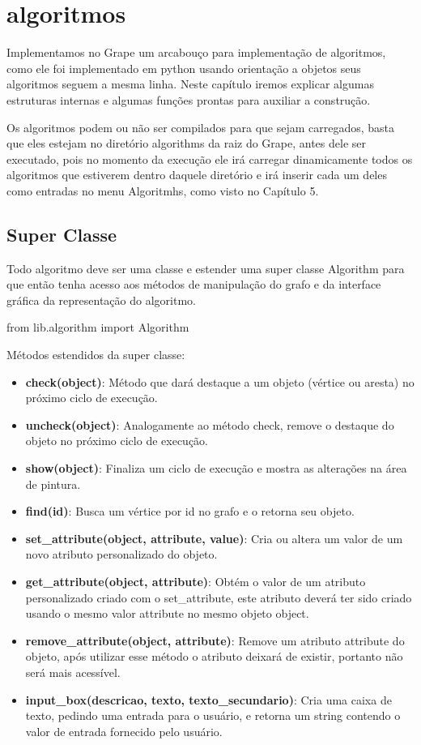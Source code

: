 \documentclass[a4paper]{abnt}
\begin{document}
\chapter{algoritmos}

Implementamos no Grape um arcabouço para implementação de algoritmos, como ele foi implementado em python usando orientação a objetos seus algoritmos seguem a mesma linha. Neste capítulo iremos explicar algumas estruturas internas e algumas funções prontas para auxiliar a construção.

Os algoritmos podem ou não ser compilados para que sejam carregados, basta que eles estejam no diretório algorithms da raiz do Grape, antes dele ser executado, pois no momento da execução ele irá carregar dinamicamente todos os algoritmos que estiverem dentro daquele diretório e irá inserir cada um deles como entradas no menu Algoritmhs, como visto no Capítulo 5.

\section{Super Classe}

Todo algoritmo deve ser uma classe e estender uma super classe Algorithm para que então tenha acesso aos métodos de manipulação do grafo e da interface gráfica da representação do algoritmo.

\begin{python}
    from lib.algorithm import Algorithm
\end{python}

Métodos estendidos da super classe:

\begin{itemize}
    \item \textbf{check(object)}: Método que dará destaque a um objeto (vértice ou aresta) no próximo ciclo de execução.
    \item \textbf{uncheck(object)}: Analogamente ao método check, remove o destaque do objeto no próximo ciclo de execução.
    \item \textbf{show(object)}: Finaliza um ciclo de execução e mostra as alterações na área de pintura.
    \item \textbf{find(id)}: Busca um vértice por id no grafo e o retorna seu objeto.
    \item \textbf{set\_attribute(object, attribute, value)}: Cria ou altera um valor de um novo atributo  personalizado do objeto.
    \item \textbf{get\_attribute(object, attribute)}: Obtém o valor de um atributo personalizado criado com o set\_attribute, este atributo deverá ter sido criado usando o mesmo valor attribute no mesmo objeto object.
    \item \textbf{remove\_attribute(object, attribute)}: Remove um atributo attribute do objeto, após utilizar esse método o atributo deixará de existir, portanto não será mais acessível.
    \item \textbf{input\_box(descricao, texto, texto\_secundario)}: Cria uma caixa de texto, pedindo uma entrada para o usuário, e retorna um string contendo o valor de entrada fornecido pelo usuário.
\end{itemize}
\end{document}

